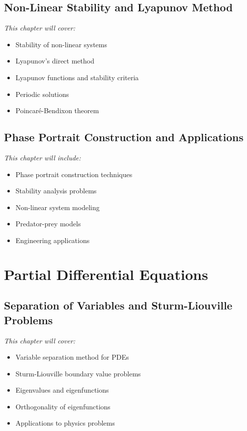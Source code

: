 \documentclass[12pt, letterpaper]{book}
\begin{document}
\chapter{Non-Linear Stability and Lyapunov Method}
\label{chap:session_15}

\textit{This chapter will cover:}
\begin{itemize}
    \item Stability of non-linear systems
    \item Lyapunov's direct method
    \item Lyapunov functions and stability criteria
    \item Periodic solutions
    \item Poincaré-Bendixon theorem
\end{itemize}

\chapter{Phase Portrait Construction and Applications}
\label{chap:session_16}

\textit{This chapter will include:}
\begin{itemize}
    \item Phase portrait construction techniques
    \item Stability analysis problems
    \item Non-linear system modeling
    \item Predator-prey models
    \item Engineering applications
\end{itemize}

\part{Partial Differential Equations}
\label{part:partial_de}

\chapter{Separation of Variables and Sturm-Liouville Problems}
\label{chap:session_17}

\textit{This chapter will cover:}
\begin{itemize}
    \item Variable separation method for PDEs
    \item Sturm-Liouville boundary value problems
    \item Eigenvalues and eigenfunctions
    \item Orthogonality of eigenfunctions
    \item Applications to physics problems
\end{itemize}
\end{document}
